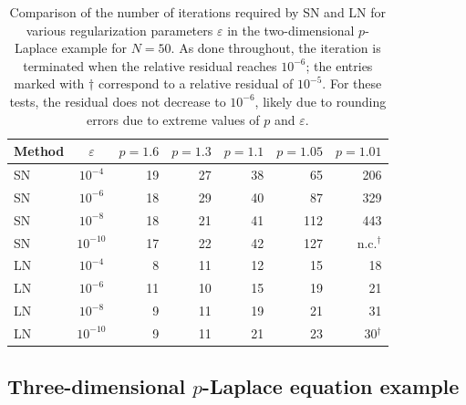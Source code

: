 \documentclass[11pt,pdflatex,sn-mathphys-num]{sn-jnl}
\theoremstyle{thmstyleone}%
\theoremstyle{thmstyletwo}%
\theoremstyle{thmstylethree}%
\begin{document}
\begin{table}[ht]
    \centering
    \caption{Comparison of the number of iterations required by SN and LN for various regularization parameters $\varepsilon$ in the two-dimensional $p$-Laplace example for $N=50$.
    As done throughout, the iteration is terminated when the relative residual reaches $10^{-6}$; the entries marked with $\dagger$ correspond to a relative residual of $10^{-5}$. For these tests,  the residual does not decrease to $10^{-6}$, likely due to rounding errors due to extreme values of $p$ and $\varepsilon$.}  \label{tab:p-Lapl-2d-epsilon}
    \begin{tabular}{lcrrrrr}
        \toprule
        Method & $\varepsilon$ & $p=1.6$ & $p=1.3$ & $p=1.1$ & $p=1.05$ & $p=1.01$ \\
        \midrule
        SN & $10^{-4}$  & 19 & 27 & 38 & 65  & 206 \\
        SN & $10^{-6}$  & 18 & 29 & 40 & 87  & 329 \\
        SN & $10^{-8}$  & 18 & 21 & 41 & 112 & 443 \\
        SN & $10^{-10}$ & 17 & 22 & 42 & 127 & n.c.$^\dagger$ \\
        \addlinespace
        LN & $10^{-4}$  & 8  & 11 & 12 & 15 & 18 \\
        LN & $10^{-6}$  & 11 & 10 & 15 & 19 & 21 \\
        LN & $10^{-8}$  & 9  & 11 & 19 & 21 & 31 \\
        LN & $10^{-10}$ & 9  & 11 & 21 & 23 & 30$^\dagger$ \\
        \bottomrule
    \end{tabular}
\end{table}



\subsection{Three-dimensional $p$-Laplace equation example}
\label{ssec:plaplace-3d}
\end{document}
